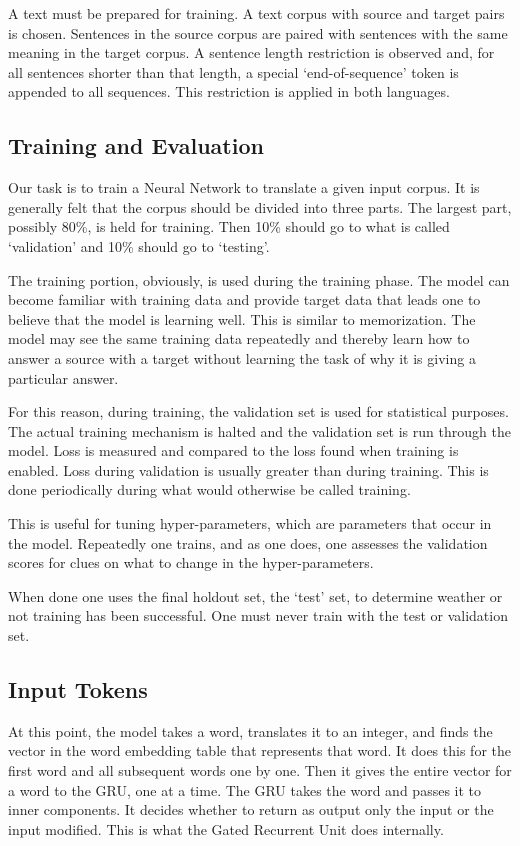 A text must be prepared for training. A text corpus with source and target pairs is chosen. Sentences in the source corpus are paired with sentences with the same meaning in the target corpus. A sentence length restriction is observed and, for all sentences shorter than that length, a special `end-of-sequence' token is appended to all sequences. This restriction is applied in both languages.

\subsection{Training and Evaluation}
Our task is to train a Neural Network to translate a given input corpus. It is generally felt that the corpus should be divided into three parts. The largest part, possibly 80\%, is held for training. Then 10\% should go to what is called `validation' and 10\% should go to `testing'.

The training portion, obviously, is used during the training phase. The model can become familiar with training data and provide target data that leads one to believe that the model is learning well. This is similar to memorization. The model may see the same training data repeatedly and thereby learn how to answer a source with a target without learning the task of why it is giving a particular answer.

For this reason, during training, the validation set is used for statistical purposes. The actual training mechanism is halted and the validation set is run through the model. Loss is measured and compared to the loss found when training is enabled. Loss during validation is usually greater than during training. This is done periodically during what would otherwise be called training.

This is useful for tuning hyper-parameters, which are parameters that occur in the model. Repeatedly one trains, and as one does, one assesses the validation scores for clues on what to change in the hyper-parameters. 

When done one uses the final holdout set, the `test' set, to determine weather or not training has been successful. One must never train with the test or validation set.

\subsection{Input Tokens}

At this point, the model takes a word, translates it to an integer, and finds the vector in the word embedding table that represents that word. It does this for the first word and all subsequent words one by one. Then it gives the entire vector for a word to the GRU, one at a time. The GRU takes the word and passes it to inner components. It decides whether to return as output only the input or the input modified. This is what the Gated Recurrent Unit does internally.

